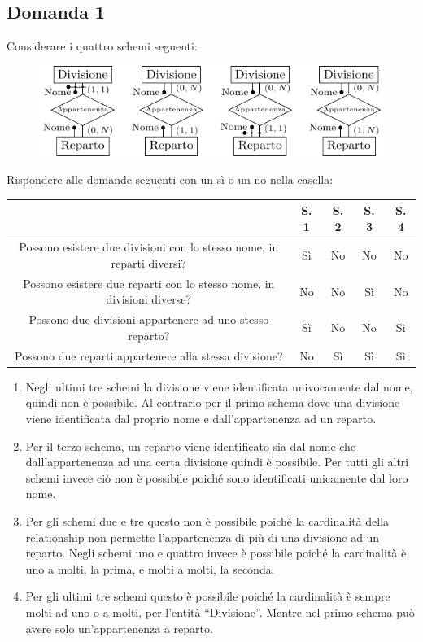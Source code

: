 \documentclass{article}
\numberwithin{equation}{subsection}
\begin{document}
\subsection{Domanda 1}

Considerare i quattro schemi seguenti:
\begin{figure}[H]%
    \centering%
    \includegraphics[scale=1.4]{domanda_8-11-24.pdf}%
\end{figure}

Rispondere alle domande seguenti con un sì o un no nella casella:
\begin{center}
    \begin{tabular}{|c|c|c|c|c|}
        \hline
        & S. 1 & S. 2 & S. 3 & S. 4\\
        \hline
        Possono esistere due divisioni con lo stesso nome, in reparti diversi? & Sì & No & No & No\\
        \hline
        Possono esistere due reparti con lo stesso nome, in divisioni diverse? & No & No & Sì & No\\
        \hline
        Possono due divisioni appartenere ad uno stesso reparto? & Sì & No & No & Sì\\
        \hline
        Possono due reparti appartenere alla stessa divisione? & No & Sì & Sì & Sì\\
        \hline        
    \end{tabular}
\end{center}

\begin{enumerate}
    \item Negli ultimi tre schemi la divisione viene identificata univocamente dal nome, quindi non è possibile. Al contrario per il primo schema dove una divisione viene identificata dal proprio nome e dall'appartenenza ad un reparto. 
    \item Per il terzo schema, un reparto viene identificato sia dal nome che dall'appartenenza ad una certa divisione quindi è possibile. Per tutti gli altri schemi invece ciò non è possibile poiché sono identificati unicamente dal loro nome. 
    \item Per gli schemi due e tre questo non è possibile poiché la cardinalità della relationship non permette l'appartenenza di più di una divisione ad un reparto. Negli schemi uno e quattro invece è possibile poiché la cardinalità è uno a molti, la prima, e molti a molti, la seconda. 
    \item Per gli ultimi tre schemi questo è possibile poiché la cardinalità è sempre molti ad uno o a molti, per l'entità ``Divisione''. Mentre nel primo schema può avere solo un'appartenenza a reparto. 
\end{enumerate}
\end{document}
